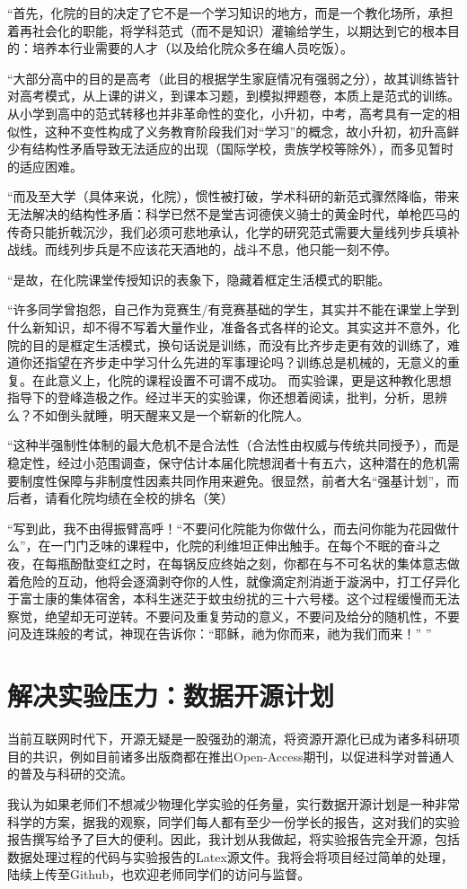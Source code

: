 “首先，化院的目的决定了它不是一个学习知识的地方，而是一个教化场所，承担着再社会化的职能，将学科范式（而不是知识）灌输给学生，以期达到它的根本目的：培养本行业需要的人才（以及给化院众多在编人员吃饭）。

“大部分高中的目的是高考（此目的根据学生家庭情况有强弱之分），故其训练皆针对高考模式，从上课的讲义，到课本习题，到模拟押题卷，本质上是范式的训练。从小学到高中的范式转移也并非革命性的变化，小升初，中考，高考具有一定的相似性，这种不变性构成了义务教育阶段我们对“学习”的概念，故小升初，初升高鲜少有结构性矛盾导致无法适应的出现（国际学校，贵族学校等除外），而多见暂时的适应困难。

“而及至大学（具体来说，化院），惯性被打破，学术科研的新范式骤然降临，带来无法解决的结构性矛盾：科学已然不是堂吉诃德侠义骑士的黄金时代，单枪匹马的传奇只能折戟沉沙，我们必须可悲地承认，化学的研究范式需要大量线列步兵填补战线。而线列步兵是不应该花天酒地的，战斗不息，他只能一刻不停。

“是故，在化院课堂传授知识的表象下，隐藏着框定生活模式的职能。

“许多同学曾抱怨，自己作为竞赛生/有竞赛基础的学生，其实并不能在课堂上学到什么新知识，却不得不写着大量作业，准备各式各样的论文。其实这并不意外，化院的目的是框定生活模式，换句话说是训练，而没有比齐步走更有效的训练了，难道你还指望在齐步走中学习什么先进的军事理论吗？训练总是机械的，无意义的重复。在此意义上，化院的课程设置不可谓不成功。
而实验课，更是这种教化思想指导下的登峰造极之作。经过半天的实验课，你还想着阅读，批判，分析，思辨么？不如倒头就睡，明天醒来又是一个崭新的化院人。

“这种半强制性体制的最大危机不是合法性（合法性由权威与传统共同授予），而是稳定性，经过小范围调查，保守估计本届化院想润者十有五六，这种潜在的危机需要制度性保障与非制度性因素共同作用来避免。很显然，前者大名“强基计划”，而后者，请看化院均绩在全校的排名（笑）

“写到此，我不由得振臂高呼！“不要问化院能为你做什么，而去问你能为花园做什么”，在一门门乏味的课程中，化院的利维坦正伸出触手。在每个不眠的奋斗之夜，在每瓶酚酞变红之时，在每锅反应终始之刻，你都在与不可名状的集体意志做着危险的互动，他将会逐滴剥夺你的人性，就像滴定剂消逝于漩涡中，打工仔异化于富士康的集体宿舍，本科生迷茫于蚊虫纷扰的三十六号楼。这个过程缓慢而无法察觉，绝望却无可逆转。不要问及重复劳动的意义，不要问及给分的随机性，不要问及连珠般的考试，神现在告诉你：“耶稣，祂为你而来，祂为我们而来！” ”

\section{解决实验压力：数据开源计划}

当前互联网时代下，开源无疑是一股强劲的潮流，将资源开源化已成为诸多科研项目的共识，例如目前诸多出版商都在推出Open-Access期刊，以促进科学对普通人的普及与科研的交流。

我认为如果老师们不想减少物理化学实验的任务量，实行数据开源计划是一种非常科学的方案，据我的观察，同学们每人都有至少一份学长的报告，这对我们的实验报告撰写给予了巨大的便利。因此，我计划从我做起，将实验报告完全开源，包括数据处理过程的代码与实验报告的Latex源文件。我将会将项目经过简单的处理，陆续上传至Github，也欢迎老师同学们的访问与监督。
